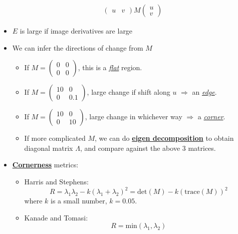 \documentclass[twocolumn,landscape,10pt]{article}
\theoremstyle{definition}
\begin{document}
\begin{itemize}
\begin{align*}
\begin{pmatrix}
                u & v
            \end{pmatrix} 
            M
            \begin{pmatrix}
                u \\
                v
            \end{pmatrix}
        \end{align*} 
    \item $E$ is large if image derivatives are large
    \item We can infer the directions of change from $M$
        \begin{itemize}
            \item If $M=\begin{pmatrix}
                    0 & 0 \\
                    0 & 0
            \end{pmatrix} $,
            this is a \underline{\emph{flat}} region.
        \item If $M=\begin{pmatrix}
                10 & 0 \\
                0 & 0.1
            \end{pmatrix} $,
            large change if shift along $u$ $\Rightarrow$ an \underline{\emph{edge}}.
        \item If $M=\begin{pmatrix}
                10 & 0 \\
                0 & 10
            \end{pmatrix} $,
            large change in whichever way $\Rightarrow$ a \underline{\emph{corner}}.
        \item If more complicated $M$, we can do \underline{\textbf{eigen
            decomposition}} to obtain diagonal matrix $\Lambda$, and compare
            against the above 3 matrices.
        \end{itemize} 
    \item \underline{\textbf{Cornerness}} metrics:
        \begin{itemize}
            \item Harris and Stephens:
                \[
                    R = \lambda_1\lambda_2-k{(\lambda_1+\lambda_2)}^{2}
                    =\text{det}(M)-k{(\text{trace}(M))}^{2}
                \]
                where $k$ is a small number, $k=0.05$.
            \item Kanade and Tomasi:
                \[
                    R = \text{min}(\lambda_1,\lambda_2)
                \]

\end{itemize}
\end{itemize}
\end{document}
